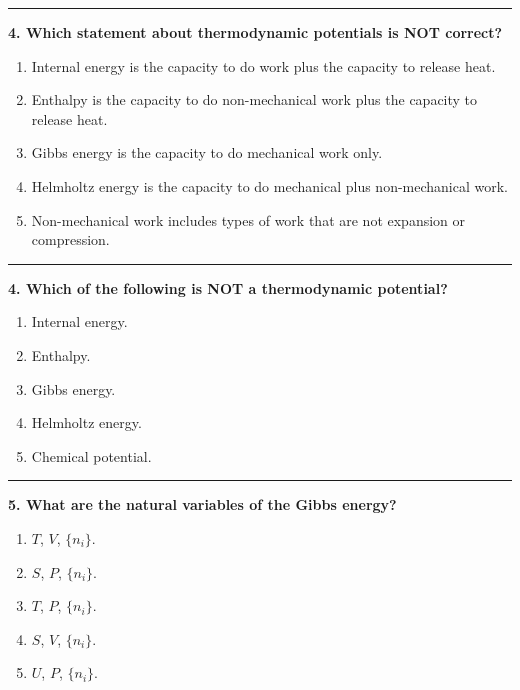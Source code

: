 \documentclass[
  9pt,
]{extbook}
\providecommand{\tightlist}{%
  \setlength{\itemsep}{0pt}\setlength{\parskip}{0pt}}
\theoremstyle{definition}
\theoremstyle{definition}
\theoremstyle{definition}
\theoremstyle{definition}
\theoremstyle{remark}
\begin{document}
\begin{center}\rule{0.5\linewidth}{0.5pt}\end{center}

\textbf{4. Which statement about thermodynamic potentials is NOT correct?}

\begin{enumerate}
\def\labelenumi{\alph{enumi}.}
\tightlist
\item
  Internal energy is the capacity to do work plus the capacity to release heat.
\item
  Enthalpy is the capacity to do non-mechanical work plus the capacity to release heat.
\item
  Gibbs energy is the capacity to do mechanical work only.
\item
  Helmholtz energy is the capacity to do mechanical plus non-mechanical work.
\item
  Non-mechanical work includes types of work that are not expansion or compression.
\end{enumerate}

\begin{center}\rule{0.5\linewidth}{0.5pt}\end{center}

\textbf{4. Which of the following is NOT a thermodynamic potential?}

\begin{enumerate}
\def\labelenumi{\alph{enumi}.}
\tightlist
\item
  Internal energy.
\item
  Enthalpy.
\item
  Gibbs energy.
\item
  Helmholtz energy.
\item
  Chemical potential.
\end{enumerate}

\begin{center}\rule{0.5\linewidth}{0.5pt}\end{center}

\textbf{5. What are the natural variables of the Gibbs energy?}

\begin{enumerate}
\def\labelenumi{\alph{enumi}.}
\tightlist
\item
  \(T\), \(V\), \(\{n_i\}\).
\item
  \(S\), \(P\), \(\{n_i\}\).
\item
  \(T\), \(P\), \(\{n_i\}\).
\item
  \(S\), \(V\), \(\{n_i\}\).
\item
  \(U\), \(P\), \(\{n_i\}\).
\end{enumerate}
\end{document}
